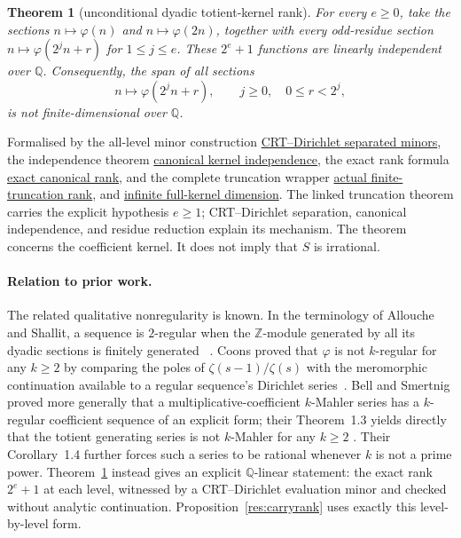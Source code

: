 \documentclass[11pt]{article}
\newcommand{\commit}{bb4e24651b37cd096d3749ef299c3317930b3a3b}
\newcommand{\repobase}{https://github.com/wcook04/plectis-lean-erdos249-257/blob/\commit}
\newcommand{\PK}{Erdos249257}
\newcommand{\lword}[4]{\href{\repobase/\PK/#1\#L#2}{#4}}
\newtheorem{theorem}{Theorem}[section]
\theoremstyle{definition}
\theoremstyle{remark}
\newcommand{\Z}{\mathbb{Z}}
\newcommand{\Q}{\mathbb{Q}}
\newcommand{\ph}{\varphi}
\begin{document}
{\begin{theorem}[unconditional dyadic totient-kernel rank]
\label{res:dyadictotient}
For every $e\geq0$, take the sections $n\mapsto\ph(n)$ and
$n\mapsto\ph(2n)$, together with every odd-residue section
$n\mapsto\ph(2^jn+r)$ for $1\leq j\leq e$.  These $2^e+1$ functions are
linearly independent over $\Q$.
Consequently, the span of all sections
\[
 n\longmapsto \ph(2^j n+r),\qquad j\geq0,\quad 0\leq r<2^j,
\]
is not finite-dimensional over $\Q$.
\end{theorem}
\noindent Formalised by the all-level minor construction
\lword{TotientMahlerDefect.lean}{882}{exists_separatedMinorCertificate_totientAffineOddFamily}{CRT--Dirichlet separated minors},
the independence theorem
\lword{TotientMahlerDefect.lean}{935}{linearIndependent_canonicalTotientKernelFamily}{canonical kernel independence},
the exact rank formula
\lword{TotientMahlerDefect.lean}{989}{finrank_canonicalTotientKernel_eq}{exact canonical rank},
and the complete truncation wrapper
\lword{TotientMahlerDefect.lean}{1084}{finrank_totientKernelThroughLevelFamily_eq}{actual finite-truncation rank},
and
\lword{TotientMahlerDefect.lean}{1145}{not_finiteDimensional_span_fullTotientKernel}{infinite full-kernel dimension}.
The linked truncation theorem carries the explicit hypothesis $e\ge1$;
CRT--Dirichlet separation, canonical independence, and residue reduction explain
its mechanism.  The theorem concerns the coefficient kernel.  It does not imply that $S$ is
irrational.

\paragraph{Relation to prior work.}
The related qualitative nonregularity is known.  In the terminology of
Allouche and Shallit, a sequence is $2$-regular when the $\Z$-module generated
by all its dyadic sections is finitely generated
~\cite[Defs.~1.1 and~2.1, author-preprint pp.~2--3]{alloucheshallit}.
Coons proved that $\ph$ is not $k$-regular for any $k\geq2$ by comparing the
poles of $\zeta(s-1)/\zeta(s)$ with the meromorphic continuation available to
a regular sequence's Dirichlet series~\cite[Theorem~3.2, pp.~348--349]{coons2010}.
Bell and Smertnig proved more generally that a multiplicative-coefficient
\(k\)-Mahler series has a \(k\)-regular coefficient sequence of an explicit
form; their Theorem~1.3 yields directly that the totient generating series is
not \(k\)-Mahler for any \(k\ge2\)
\cite[Theorem~1.3, pp.~2--3]{bellsmertnig2026}.  Their Corollary~1.4 further
forces such a series to be rational whenever \(k\) is not a prime power.
Theorem~\ref{res:dyadictotient} instead gives an explicit $\Q$-linear statement:
the exact rank $2^e+1$ at each level, witnessed by a CRT--Dirichlet evaluation
minor and checked without analytic continuation.
Proposition~\ref{res:carryrank} uses exactly this level-by-level form.

}
\end{document}
